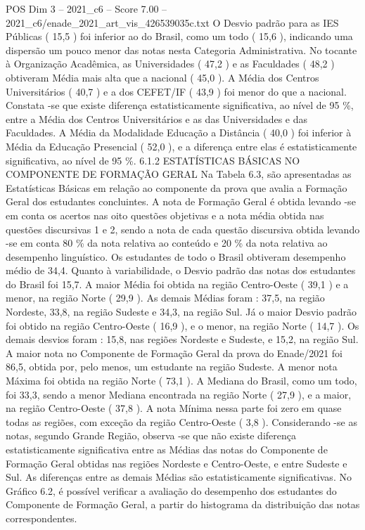 \begin{textsample}{POS Dim 3 – 2021\_c6 – Score 7.00 – 2021\_c6/enade\_2021\_art\_vis\_426539035c.txt}
O Desvio padrão para as IES Públicas ( 15,5 ) foi inferior ao do Brasil, como um todo ( 15,6 ), indicando uma dispersão um pouco menor das notas nesta Categoria Administrativa.
No tocante à Organização Acadêmica, as Universidades ( 47,2 ) e as Faculdades ( 48,2 ) obtiveram Média mais alta que a nacional ( 45,0 ).
A Média dos Centros Universitários ( 40,7 ) e a dos CEFET/IF ( 43,9 ) foi menor do que a nacional.
Constata -se que existe diferença estatisticamente significativa, ao nível de 95 \%, entre a Média dos Centros Universitários e as das Universidades e das Faculdades.
A Média da Modalidade Educação a Distância ( 40,0 ) foi inferior à Média da Educação Presencial ( 52,0 ), e a diferença entre elas é estatisticamente significativa, ao nível de 95 \%. 6.1.2 ESTATÍSTICAS BÁSICAS NO COMPONENTE DE FORMAÇÃO GERAL Na Tabela 6.3, são apresentadas as Estatísticas Básicas em relação ao componente da prova que avalia a Formação Geral dos estudantes concluintes.
A nota de Formação Geral é obtida levando -se em conta os acertos nas oito questões objetivas e a nota média obtida nas questões discursivas 1 e 2, sendo a nota de cada questão discursiva obtida levando -se em conta 80 \% da nota relativa ao conteúdo e 20 \% da nota relativa ao desempenho linguístico.
Os estudantes de todo o Brasil obtiveram desempenho médio de 34,4.
Quanto à variabilidade, o Desvio padrão das notas dos estudantes do Brasil foi 15,7.
A maior Média foi obtida na região Centro-Oeste ( 39,1 ) e a menor, na região Norte ( 29,9 ).
As demais Médias foram : 37,5, na região Nordeste, 33,8, na região Sudeste e 34,3, na região Sul.
Já o maior Desvio padrão foi obtido na região Centro-Oeste ( 16,9 ), e o menor, na região Norte ( 14,7 ).
Os demais desvios foram : 15,8, nas regiões Nordeste e Sudeste, e 15,2, na região Sul.
A maior nota no Componente de Formação Geral da prova do Enade/2021 foi 86,5, obtida por, pelo menos, um estudante na região Sudeste.
A menor nota Máxima foi obtida na região Norte ( 73,1 ).
A Mediana do Brasil, como um todo, foi 33,3, sendo a menor Mediana encontrada na região Norte ( 27,9 ), e a maior, na região Centro-Oeste ( 37,8 ).
A nota Mínima nessa parte foi zero em quase todas as regiões, com exceção da região Centro-Oeste ( 3,8 ).
Considerando -se as notas, segundo Grande Região, observa -se que não existe diferença estatisticamente significativa entre as Médias das notas do Componente de Formação Geral obtidas nas regiões Nordeste e Centro-Oeste, e entre Sudeste e Sul.
As diferenças entre as demais Médias são estatisticamente significativas.
No Gráfico 6.2, é possível verificar a avaliação do desempenho dos estudantes do Componente de Formação Geral, a partir do histograma da distribuição das notas correspondentes.

\end{textsample}

